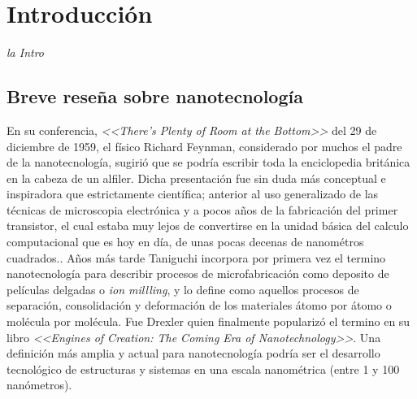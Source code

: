  \newcommand{\NoBiblioIntro}[1]{
 \ifthenelse{\equal{#1}{verdadero}}{}{}
 \NoBiblioIntro{verdadero}}


 \FormatoCapituloUnaLinea

 \chapter{Introducción}\label{chap:Introduccion}

 \thispagestyle{empty}
	
 \noindent\textit{la Intro}

 
 \vfill
 \minitoc
 \newpage

\section{Breve reseña sobre nanotecnología}

	En su conferencia, \textit{<<There's Plenty of Room at the Bottom>>} del 29 de diciembre de 1959, el físico Richard Feynman, considerado por muchos el padre de la nanotecnología, sugirió que se podría escribir toda la enciclopedia británica en la cabeza de un alfiler. Dicha presentación fue sin duda más conceptual e inspiradora que estrictamente científica\cite{Feynman1959}; anterior al uso generalizado de las técnicas de microscopia electrónica y a pocos años de la fabricación del primer transistor, el cual estaba muy lejos de convertirse en la unidad básica del calculo computacional que es hoy en día, de unas pocas decenas de nanométros cuadrados.. Años más tarde Taniguchi incorpora por primera vez el termino nanotecnología para describir procesos de microfabricación como deposito de películas delgadas o \textit{ion millling}, y lo define como aquellos procesos de separación, consolidación y deformación de los materiales átomo por átomo o molécula por molécula. \cite{taniguchi1974} Fue Drexler quien finalmente popularizó el termino en su libro \textit{<<Engines of Creation: The Coming Era of Nanotechnology>>}\cite{drexler1987}. Una definición más amplia y actual para nanotecnología podría ser el desarrollo tecnológico de estructuras y sistemas en una escala nanométrica (entre 1 y 100 nanómetros). 

